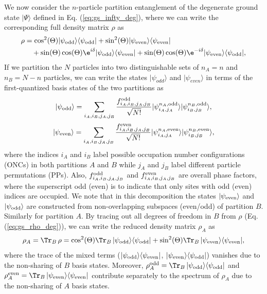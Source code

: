 We now consider the $n$-particle partition entanglement of the degenerate ground
state $\vert\Psi\rangle$ defined in Eq. (\ref{eq:gs_infty_deg}), where we can
write the corresponding full density matrix $\rho$ as 
\begin{eqnarray}
\rho &=\cos^2(\Theta)\vert\psi_{\rm{odd}}\rangle\langle\psi_{\rm{odd}}\vert+\sin^2(\Theta)\vert\psi_{\rm{even}}\rangle\langle\psi_{\rm{even}}\vert\nonumber\\
&\quad+\sin(\Theta)\cos(\Theta)\e^{i\delta}\vert\psi_{\rm{odd}}\rangle\langle\psi_{\rm{even}}\vert+\sin(\Theta)\cos(\Theta)\e^{-i\delta}\vert\psi_{\rm{even}}\rangle\langle\psi_{\rm{odd}}\vert,
\label{eq:gs_rho_deg}
\end{eqnarray}
If we partition the $N$ particles into two distinguishable sets 
of $n_A=n$ and $n_B=N-n$ particles, we can write the states $\vert
\psi_{odd}\rangle$ and $\vert \psi_{even}\rangle$ in terms of the
first-quantized basis states of the two partitions as
%
\begin{equation}
\vert \psi_{\rm{odd}}\rangle=\sum_{i_A,i_B,j_A,j_B} \frac{f_{i_A,i_B,j_A,j_B}^{\rm{odd}}}{\sqrt{N!}}\vert \psi^{n_A,\rm{odd}}_{i_A,j_A}\rangle\vert \psi^{n_B,\rm{odd}}_{i_B,j_B}\rangle
\label{Psi_odd_AB},
\end{equation}
%
\begin{equation}
\vert \psi_{\rm{even}}\rangle=\sum_{i_A,i_B,j_A,j_B} \frac{f_{i_A,i_B,j_A,j_B}^{\rm{even}}}{\sqrt{N!}}\vert \psi^{n_A,\rm{even}}_{i_A,j_A}\rangle\vert \psi^{n_B,\rm{even}}_{i_B,j_B}\rangle
\label{Psi_even_AB},
\end{equation}
%
where the indices $i_A$ and $i_B$ label possible  occupation number
configurations (ONCs) in both partitions $A$ and $B$ while $j_A$ and $j_B$
label different particle permutations (PPs). Also, $f_{i_A,i_B,j_A,j_B}^{\rm{odd}}$ and
$f_{i_A,i_B,j_A,j_B}^{\rm{even}}$ are overall phase factors, where the
superscript odd (even) is to indicate that only sites with odd (even) indices
are occupied.  We note that in this decomposition  the states
$\vert\psi_{\rm{even}}\rangle$ and $\vert \psi_{\rm{odd}}\rangle$ 
are constructed from non-overlapping subspaces (even/odd) of partition $B$.
Similarly for partition $A$.
By tracing out all degrees of freedom in $B$ from $\rho$ (Eq.
(\ref{eq:gs_rho_deg})), we can write the reduced density matrix $\rho_A$ as
%
\begin{equation}
    \rho_A = {\Tr}_{B}\,\rho= \cos^2(\Theta){\Tr}_{B}\,\vert\psi_{\rm{odd}}\rangle\langle\psi_{\rm{odd}}\vert+\sin^2(\Theta) {\Tr}_{B}\, \vert\psi_{\rm{even}}\rangle\langle\psi_{\rm{even}}\vert,
\label{eq:rho_A_final}
\end{equation}
%
where the trace of the mixed terms
($\vert\psi_{\rm{odd}}\rangle\langle\psi_{\rm{even}}\vert$,
$\vert\psi_{\rm{even}}\rangle\langle\psi_{\rm{odd}}\vert$) vanishes due to the
non-sharing of $B$ basis states.  Moreover, 
$\rho_A^{\rm odd}={\Tr}_{B}\,\vert\psi_{\rm{odd}}\rangle\langle\psi_{\rm{odd}}\vert$
and $\rho_A^{\rm even}={\Tr}_{B}\,
\vert\psi_{\rm{even}}\rangle\langle\psi_{\rm{even}}\vert$ contribute separately
to the spectrum of $\rho_A$ due to the non-sharing of $A$ basis states.

